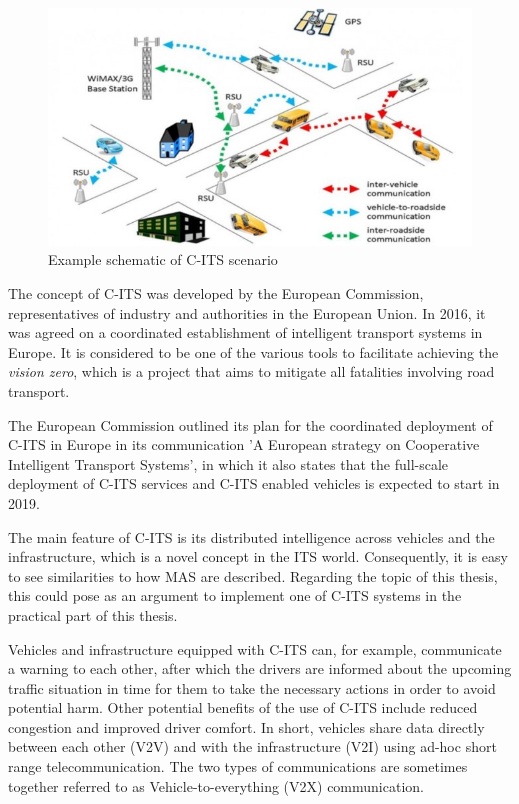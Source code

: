 \documentclass[main.tex]{subfiles}
\begin{document}
\begin{figure}[htbp]
    \centering
    \includegraphics[width=.8\textwidth]{c-its.jpg}
    \caption{Example schematic of C-ITS scenario}
    \label{c-its}
\end{figure}

The concept of C-ITS was developed by the European Commission, representatives of industry and 
authorities in the European Union. In 2016, it was agreed on a coordinated establishment of intelligent
transport systems in Europe. It is considered to be one of the various tools to facilitate achieving 
the \emph{vision zero}, which is a project that aims to mitigate all fatalities involving road 
transport.

The European Commission outlined its plan for the coordinated deployment of C-ITS in Europe in
its communication 'A European strategy on Cooperative Intelligent Transport Systems', in which
it also states that the full-scale deployment of C-ITS services and C-ITS enabled vehicles is
expected to start in 2019.

The main feature of C-ITS is its distributed intelligence across vehicles and the infrastructure, 
which is a novel concept in the ITS world. Consequently, it is easy to see similarities to how 
MAS are described. Regarding the topic of this thesis, this could pose as an argument to
implement one of C-ITS systems in the practical part of this thesis.

Vehicles and infrastructure equipped with C-ITS can, for example, communicate a warning to each
other, after which the drivers are informed about the upcoming traffic situation in time for
them to take the necessary actions in order to avoid potential harm. Other potential benefits
of the use of C-ITS include reduced congestion and improved driver comfort. In short, vehicles 
share data directly between each other (V2V) and with the infrastructure (V2I) using ad-hoc
short range telecommunication. The two types of communications are sometimes together referred 
to as Vehicle-to-everything (V2X) communication.
\end{document}
